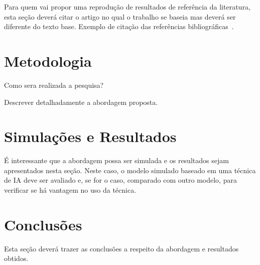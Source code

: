 \documentclass[english]{article}
\begin{document}
Para quem vai propor uma reprodução de resultados de referência da literatura, esta
seção deverá citar o artigo no qual o trabalho se baseia mas deverá ser diferente
do texto base.
Exemplo de citação das referências
bibliográficas~\cite{Russell:2003,Pedrycz:2007,haykin2001redes,Braga:2007}.
\vspace{2cm}
\section{Metodologia}
\vspace{1cm} Como sera realizada a pesquisa? \vspace{1cm}

Descrever detalhadamente a abordagem proposta. \vspace{2cm}
\section{Simulações e Resultados}
\vspace{1cm} É interessante que a abordagem possa ser simulada e
os resultados sejam apresentados nesta seção. Neste caso, o modelo
simulado baseado em uma técnica de IA deve ser avaliado e, se for o caso,
comparado com outro modelo, para verificar se há vantagem no uso
da técnica. \vspace{2cm}
\section{Conclusões}
\vspace{1cm} Esta seção deverá trazer as conclusões a respeito da
abordagem e resultados obtidos. \vspace{2cm}



\end{document}
